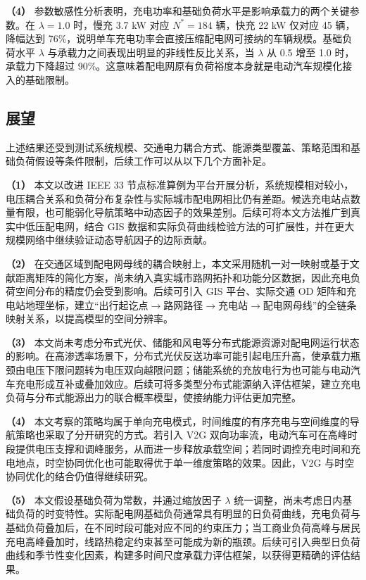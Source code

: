 \documentclass[10pt,a4paper]{article}
\numberwithin{equation}{section}
\numberwithin{table}{section}
\numberwithin{figure}{section}
\begin{document}
    \textbf{（4）}
    参数敏感性分析表明，充电功率和基础负荷水平是影响承载力的两个关键参数。在 $\lambda = 1.0$ 时，慢充 3.7 kW 对应 $N^* = 184$ 辆，快充 22 kW 仅对应 45 辆，降幅达到 76\%，说明单车充电功率会直接压缩配电网可接纳的车辆规模。基础负荷水平 $\lambda$ 与承载力之间表现出明显的非线性反比关系，当 $\lambda$ 从 0.5 增至 1.0 时，承载力下降超过 90\%。这意味着配电网原有负荷裕度本身就是电动汽车规模化接入的基础限制。

    \subsection{展望}

    上述结果还受到测试系统规模、交通电力耦合方式、能源类型覆盖、策略范围和基础负荷假设等条件限制，后续工作可以从以下几个方面补足。

    \textbf{（1）}
    本文以改进 IEEE 33 节点标准算例为平台开展分析，系统规模相对较小，电压耦合关系和负荷分布复杂性与实际城市配电网相比仍有差距。候选充电站点数量有限，也可能弱化导航策略中动态因子的效果差别。后续可将本文方法推广到真实中低压配电网，结合 GIS 数据和实际负荷曲线检验方法的可扩展性，并在更大规模网络中继续验证动态导航因子的边际贡献。

    \textbf{（2）}
    在交通区域到配电网母线的耦合映射上，本文采用随机一对一映射或基于文献距离矩阵的简化方案，尚未纳入真实城市路网拓扑和功能分区数据，因此充电负荷空间分布的精度仍会受到影响。后续可引入 GIS 平台、实际交通 OD 矩阵和充电站地理坐标，建立“出行起讫点$\rightarrow$路网路径$\rightarrow$充电站$\rightarrow$配电网母线”的全链条映射关系，以提高模型的空间分辨率。

    \textbf{（3）}
    本文尚未考虑分布式光伏、储能和风电等分布式能源资源对配电网运行状态的影响。在高渗透率场景下，分布式光伏反送功率可能引起电压升高，使承载力瓶颈由电压下限问题转为电压双向越限问题；储能系统的充放电行为也可能与电动汽车充电形成互补或叠加效应。后续可将多类型分布式能源纳入评估框架，建立充电负荷与分布式能源出力的联合概率模型，使接纳能力评估更加完整。

    \textbf{（4）}
    本文考察的策略均属于单向充电模式，时间维度的有序充电与空间维度的导航策略也采取了分开研究的方式。若引入 V2G 双向功率流，电动汽车可在高峰时段提供电压支撑和调峰服务，从而进一步释放承载空间；若同时调控充电时间和充电地点，时空协同优化也可能取得优于单一维度策略的效果。因此，V2G 与时空协同优化的结合仍值得继续研究。

    \textbf{（5）}
    本文假设基础负荷为常数，并通过缩放因子 $\lambda$ 统一调整，尚未考虑日内基础负荷的时变特性。实际配电网基础负荷通常具有明显的日负荷曲线，充电负荷与基础负荷叠加后，在不同时段可能对应不同的约束压力；当工商业负荷高峰与居民充电高峰叠加时，线路热稳定约束甚至可能成为新的瓶颈。后续可引入典型日负荷曲线和季节性变化因素，构建多时间尺度承载力评估框架，以获得更精确的评估结果。
\end{document}
